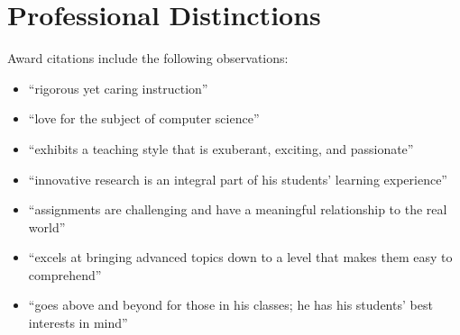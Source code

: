 \documentclass[11pt,letterpaper,sans]{moderncv}
\begin{document}





\vspace*{-.175in}
\section{Professional Distinctions}


{Award citations include the following observations: \vspace*{.025in}
  \begin{itemize}
    \renewcommand\labelitemi{\Large\textbullet}
    \item ``rigorous yet caring instruction''
    \item ``love for the subject of computer science''
    \item ``exhibits a teaching style that is exuberant, exciting, and passionate''
    \item ``innovative research is an integral part of his students’ learning experience''
    \item ``assignments are challenging and have a meaningful relationship to the real world''
    \item ``excels at bringing advanced topics down to a level that makes them easy to comprehend''
    \item ``goes above and beyond for those in his classes; he has his students’ best interests in mind''
  \end{itemize}}
\end{document}

